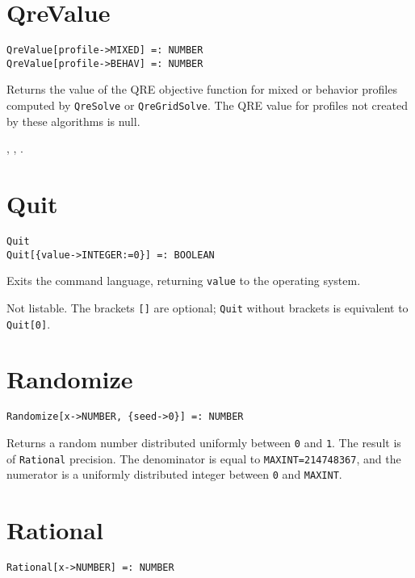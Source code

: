 
\section*{QreValue}\label{PrimQreValue}
\begin{verbatim}
QreValue[profile->MIXED] =: NUMBER 
QreValue[profile->BEHAV] =: NUMBER 
\end{verbatim}

\noindent
Returns the value of the QRE objective function for mixed or behavior
profiles computed by \verb+QreSolve+ or \verb+QreGridSolve+.  The QRE
value for profiles not created by these algorithms is null.

\seealso {},
, .


\section*{Quit}\label{PrimQuit}
\begin{verbatim}
Quit
Quit[{value->INTEGER:=0}] =: BOOLEAN
\end{verbatim}

\noindent
Exits the command language, returning \texttt{value} to the operating system.

\note Not listable.  The brackets \texttt{[]} are optional; 
\texttt{Quit} without brackets is equivalent to \texttt{Quit[0]}.


\section*{Randomize}\label{PrimRandomize}
\begin{verbatim}
Randomize[x->NUMBER, {seed->0}] =: NUMBER
\end{verbatim}

\noindent
Returns a random number distributed uniformly between \verb+0+ and
\verb+1+.  The result is of \verb+Rational+ precision.  The
denominator is equal to \verb+MAXINT=214748367+, and the numerator is
a uniformly distributed integer between \verb+0+ and \verb+MAXINT+.


\section*{Rational}\label{PrimRational}
\begin{verbatim}
Rational[x->NUMBER] =: NUMBER
\end{verbatim}

